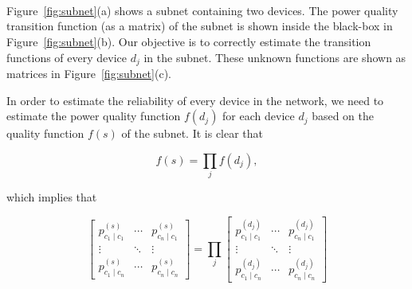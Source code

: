 \begin{figure*}[!p]
\centering
	\\ \vspace{1cm}
	\\ \vspace{1cm}
	 \\\vspace{0.5cm}
\caption{The power transition matrix $f(s)$ of a subnet $s$ as a product of the power transition matrices of individual devices.} \label{fig:subnet}
\end{figure*}

Figure~\ref{fig:subnet}(a) shows a subnet containing two devices. The power quality transition function (as a matrix) of the subnet is shown inside the black-box in Figure~\ref{fig:subnet}(b). Our objective is to correctly estimate the transition functions of every device $d_j$ in the subnet. These unknown functions are shown as matrices in Figure~\ref{fig:subnet}(c).

In order to estimate the reliability of every device in the network, we need to estimate the power quality function $f(d_j)$ for each device $d_j$ based on the quality function $f(s)$ of the subnet. It is clear that

\vspace{0.5cm}
\begin{equation}
f(s) = \prod_{j} f(d_j),
\end{equation}
\vspace{0.5cm}

\noindent
which implies that


\begin{equation}
\left[\begin{array}{ccc}
p_{c_1  \mid c_1}^{(s)} & \cdots & p_{c_n  \mid c_1}^{(s)}\\
\vdots & \ddots & \vdots\\
p_{c_1  \mid c_n}^{(s)} & \cdots & p_{c_n  \mid c_n}^{(s)}
\end{array}\right]= \prod_j { \left[\begin{array}{ccc}
p_{c_1 \mid c_1}^{(d_j)} & \cdots & p_{c_n  \mid c_1}^{(d_j)}\\
\vdots & \ddots & \vdots\\
p_{c_1 \mid c_n}^{(d_j)} & \cdots & p_{c_n \mid c_n}^{(d_j)}\end{array}\right]}
\label{eqn:product}
\end{equation}
\vspace{1cm}

